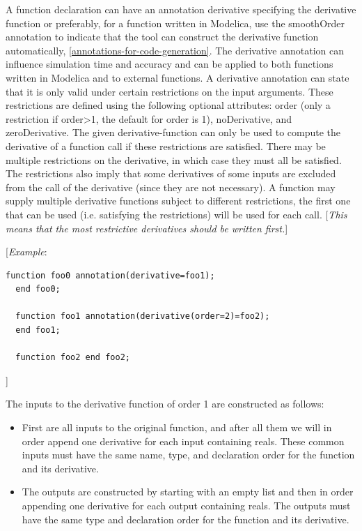 \documentclass[10pt,a4paper]{report}
\begin{document}
A function declaration can have an annotation derivative specifying the
derivative function or preferably, for a function written in Modelica,
use the smoothOrder annotation to indicate that the tool can construct
the derivative function automatically, \ref{annotations-for-code-generation}. The derivative
annotation can influence simulation time and accuracy and can be applied
to both functions written in Modelica and to external functions. A
derivative annotation can state that it is only valid under certain
restrictions on the input arguments. These restrictions are defined
using the following optional attributes: order (only a restriction if
order\textgreater{}1, the default for order is 1), noDerivative, and
zeroDerivative. The given derivative-function can only be used to
compute the derivative of a function call if these restrictions are
satisfied. There may be multiple restrictions on the derivative, in
which case they must all be satisfied. The restrictions also imply that
some derivatives of some inputs are excluded from the call of the
derivative (since they are not necessary). A function may supply
multiple derivative functions subject to different restrictions, the
first one that can be used (i.e. satisfying the restrictions) will be
used for each call. {[}\emph{This means that the most restrictive
derivatives should be written first.}{]}

{[}\emph{Example}:

\begin{lstlisting}[language=modelica]
  function foo0 annotation(derivative=foo1);
  end foo0;

  function foo1 annotation(derivative(order=2)=foo2);
  end foo1;

  function foo2 end foo2;
\end{lstlisting}
{]}

The inputs to the derivative function of order 1 are constructed as
follows:

\begin{itemize}
\item
  First are all inputs to the original function, and after all them we
  will in order append one derivative for each input containing reals.
  These common inputs must have the same name, type, and declaration
  order for the function and its derivative.
\end{itemize}

\begin{itemize}
\item
  The outputs are constructed by starting with an empty list and then in
  order appending one derivative for each output containing reals. The
  outputs must have the same type and declaration order for the function
  and its derivative.
\end{itemize}
\end{document}
